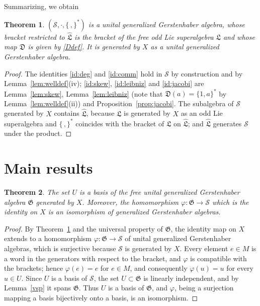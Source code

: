 \documentclass[11pt,reqno]{amsart}
\newcommand{\G}{\mathfrak G}
\newcommand{\LL}{\mathfrak L}
\newcommand{\D}{\mathfrak D}
\newcommand{\Sm}{\mathcal S}
\newcommand{\Lh}{\widehat{\LL}}
\theoremstyle{plain}
\newtheorem{theorem}{Theorem}
\theoremstyle{definition}
\theoremstyle{remark}
\begin{document}
Summarizing, we obtain

\begin{theorem}\label{thm:model}
$(\Sm,\cdot,\{\,,\}^*)$ is a unital generalized Gerstenhaber algebra, whose bracket restricted to $\Lh$ is the bracket of the free odd Lie superalgebra $\LL$ and whose map $\D$ is given by \eqref{Ddef}.
It is generated by $X$ as a unital generalized Gerstenhaber algebra.
\end{theorem}

\begin{proof}
The identities \eqref{id:deg} and \eqref{id:comm} hold in $\Sm$ by construction and by Lemma~\ref{lem:welldef}(iv); \eqref{id:skew}, \eqref{id:leibniz} and \eqref{id:jacobi} are Lemma~\ref{lem:skew}, Lemma~\ref{lem:leibniz} (note that $\D(a)=\{1,a\}^*$ by Lemma~\ref{lem:welldef}(ii)) and Proposition~\ref{prop:jacobi}.
The subalgebra of $\Sm$ generated by $X$ contains $\Lh$, because $\LL$ is generated by $X$ as an odd Lie superalgebra and $\{\,,\}^*$ coincides with the bracket of $\LL$ on $\Lh$; and $\Lh$ generates $\Sm$ under the product.
\end{proof}

\section{Main results}

\begin{theorem}\label{basis}
The set $U$ is a basis of the free unital generalized Gerstenhaber algebra $\G$ generated by $X$.
Moreover, the homomorphism $\varphi\colon\G\to\Sm$ which is the identity on $X$ is an isomorphism of generalized Gerstenhaber algebras.
\end{theorem}

\begin{proof}
By Theorem~\ref{thm:model} and the universal property of $\G$, the identity map on $X$ extends to a homomorphism $\varphi\colon\G\to\Sm$ of unital generalized Gerstenhaber algebras, which is surjective because $\Sm$ is generated by $X$.
Every element $e\in M$ is a word in the generators with respect to the bracket, and $\varphi$ is compatible with the brackets; hence $\varphi(e)=e$ for $e\in M$, and consequently $\varphi(u)=u$ for every $u\in U$.
Since $U$ is a basis of $\Sm$, the set $U\subset\G$ is linearly independent, and by Lemma~\ref{vsp} it spans $\G$.
Thus $U$ is a basis of $\G$, and $\varphi$, being a surjection mapping a basis bijectively onto a basis, is an isomorphism.
\end{proof}
\end{document}
